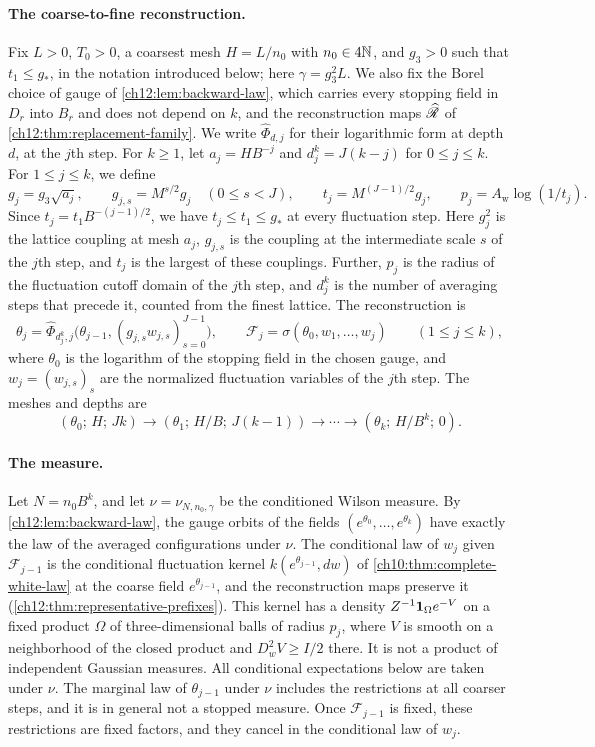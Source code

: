 \paragraph{The coarse-to-fine reconstruction.}
Fix $L>0$, $T_0>0$, a coarsest mesh $H=L/n_0$ with $n_0\in4\mathbb N$, and $g_3>0$ such that $t_1\le g_*$, in the notation introduced below; here $\gamma=g_3^2L$. We also fix the Borel choice of gauge of \cref{ch12:lem:backward-law}, which carries every stopping field in $D_r$ into $B_r$ and does not depend on $k$, and the reconstruction maps $\widehat{\mathscr R}$ of \cref{ch12:thm:replacement-family}. We write $\widehat\Phi_{d,j}$ for their logarithmic form at depth $d$, at the $j$th step. For $k\ge1$, let $a_j=HB^{-j}$ and $d_j^k=J(k-j)$ for $0\le j\le k$. For $1\le j\le k$, we define
\[
 g_j=g_3\sqrt{a_j},\qquad g_{j,s}=M^{s/2}g_j\quad(0\le s<J),\qquad t_j=M^{(J-1)/2}g_j,\qquad p_j=A_{\mathrm w}\log(1/t_j).
\]
Since $t_j=t_1B^{-(j-1)/2}$, we have $t_j\le t_1\le g_*$ at every fluctuation step. Here $g_j^2$ is the lattice coupling at mesh $a_j$, $g_{j,s}$ is the coupling at the intermediate scale $s$ of the $j$th step, and $t_j$ is the largest of these couplings. Further, $p_j$ is the radius of the fluctuation cutoff domain of the $j$th step, and $d_j^k$ is the number of averaging steps that precede it, counted from the finest lattice. The reconstruction is
\begin{equation}\label{ch14:eq:backward-chain}
 \theta_j=\widehat\Phi_{d_j^k,j}\bigl(\theta_{j-1},(g_{j,s}w_{j,s})_{s=0}^{J-1}\bigr),\qquad
 \mathcal F_j=\sigma(\theta_0,w_1,\dots,w_j)\qquad(1\le j\le k),
\end{equation}
where $\theta_0$ is the logarithm of the stopping field in the chosen gauge, and $w_j=(w_{j,s})_s$ are the normalized fluctuation variables of the $j$th step. The meshes and depths are
\[
 (\theta_0;\,H;\,Jk)\longrightarrow(\theta_1;\,H/B;\,J(k-1))\longrightarrow\cdots\longrightarrow(\theta_k;\,H/B^k;\,0).
\]

\paragraph{The measure.}
Let $N=n_0B^k$, and let $\nu=\nu_{N,n_0,\gamma}$ be the conditioned Wilson measure. By \cref{ch12:lem:backward-law}, the gauge orbits of the fields $(e^{\theta_0},\dots,e^{\theta_k})$ have exactly the law of the averaged configurations under $\nu$. The conditional law of $w_j$ given $\mathcal F_{j-1}$ is the conditional fluctuation kernel $k(e^{\theta_{j-1}},dw)$ of \cref{ch10:thm:complete-white-law} at the coarse field $e^{\theta_{j-1}}$, and the reconstruction maps preserve it (\cref{ch12:thm:representative-prefixes}). This kernel has a density $Z^{-1}\mathbf 1_\Omega e^{-V}$ on a fixed product $\Omega$ of three-dimensional balls of radius $p_j$, where $V$ is smooth on a neighborhood of the closed product and $D_w^2V\ge I/2$ there. It is not a product of independent Gaussian measures. All conditional expectations below are taken under $\nu$. The marginal law of $\theta_{j-1}$ under $\nu$ includes the restrictions at all coarser steps, and it is in general not a stopped measure. Once $\mathcal F_{j-1}$ is fixed, these restrictions are fixed factors, and they cancel in the conditional law of $w_j$.


